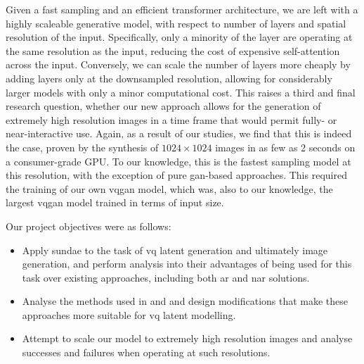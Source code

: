 Given a fast sampling and an efficient transformer architecture, we are left
with a highly scaleable generative model, with respect to number of layers and
spatial resolution of the input. Specifically, only a minority of the layer are
operating at the same resolution as the input, reducing the cost of expensive
self-attention across the input. Conversely, we can scale the number of layers
more cheaply by adding layers only at the downsampled resolution, allowing for
considerably larger models with only a minor computational cost. This
raises a third and final research question, whether our new approach allows for
the generation of extremely high resolution images in a time frame that would
permit fully- or near-interactive use. Again, as a result of our studies, we
find that this is indeed the case, proven by the synthesis of $1024 \times 1024$
images in as few as 2 seconds on a consumer-grade GPU. To our knowledge, this is
the fastest sampling model at this resolution, with the exception of pure
\gls{gan}-based approaches. This required the training of our own \gls{vqgan}
model, which was, also to our knowledge, the largest \gls{vqgan} model trained
in terms of input size.


Our project objectives were as follows:
\begin{itemize}
    \item Apply \gls{sundae} to the task of \acrshort{vq} latent generation and
        ultimately image generation, and perform analysis into their advantages
        of being used for this task over existing approaches, including both
        \gls{ar} and \gls{nar} solutions.

    \item Analyse the methods used in \citet{savinov2022stepunrolled} and
        \citet{nawrot2021hierarchical} and design modifications that make these
        approaches more suitable for \acrshort{vq} latent modelling.

    \item Attempt to scale our model to extremely high resolution images and
        analyse successes and failures when operating at such resolutions. 

\end{itemize}

